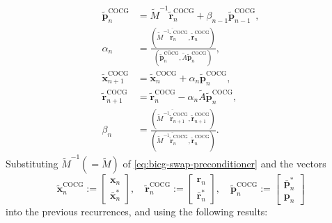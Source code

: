 \[\begin{aligned}
\widetilde{\bm p}_n^{\mathrm{COCG}}&=\widetilde M^{-1}\widetilde{\bm r}_n^{\mathrm{COCG}}+\beta_{n-1}\widetilde{\bm p}_{n-1}^{\mathrm{COCG}},\\
\alpha_n&=\frac{(\overline{\widetilde M^{-1}\widetilde{\bm r}_n^{\mathrm{COCG}}},\widetilde{\bm r}_n^{\mathrm{COCG}})}{(\overline{\widetilde{\bm p}_n^{\mathrm{COCG}}},\widetilde A\widetilde{\bm p}_n^{\mathrm{COCG}})},\\
\widetilde{\bm x}_{n+1}^{\mathrm{COCG}}&=\widetilde{\bm x}_n^{\mathrm{COCG}}+\alpha_n\widetilde{\bm p}_n^{\mathrm{COCG}},\\
\widetilde{\bm r}_{n+1}^{\mathrm{COCG}}&=\widetilde{\bm r}_n^{\mathrm{COCG}}-\alpha_n\widetilde A\widetilde{\bm p}_n^{\mathrm{COCG}},\\
\beta_n&=\frac{(\overline{\widetilde M^{-1}\widetilde{\bm r}_{n+1}^{\mathrm{COCG}}},\widetilde{\bm r}_{n+1}^{\mathrm{COCG}})}{(\overline{\widetilde M^{-1}\widetilde{\bm r}_n^{\mathrm{COCG}}},\widetilde{\bm r}_n^{\mathrm{COCG}})}.
\end{aligned}\]
{Substituting $\widetilde M^{-1}(=\widetilde M)$ of \eqref{eq:bicg-swap-preconditioner} and the vectors}
\[\widetilde{\bm x}_n^{\mathrm{COCG}}:=\begin{bmatrix}\bm x_n\\\bar{\bm x}_n^{*}\end{bmatrix},\quad\widetilde{\bm r}_n^{\mathrm{COCG}}:=\begin{bmatrix}\bm r_n\\\bar{\bm r}_n^{*}\end{bmatrix},\quad\widetilde{\bm p}_n^{\mathrm{COCG}}:=\begin{bmatrix}\bar{\bm p}_n^{*}\\\bm p_n\end{bmatrix}\]
{into the previous recurrences, and using the following results:}
